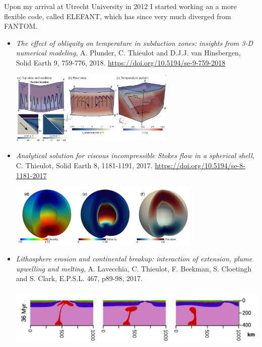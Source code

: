 Upon my arrival at Utrecht University in 2012 I started working an a more flexible code, called ELEFANT, which has since very much 
diverged from FANTOM.

\begin{itemize}
\item {\it The effect of obliquity on temperature in subduction zones: insights from 3-D numerical modeling}, 
A. Plunder, C. Thieulot and D.J.J. van Hinsbergen, Solid Earth 9, 759-776, 2018. \url{https://doi.org/10.5194/se-9-759-2018}

\begin{center}
\includegraphics[height=3.5cm]{images/mycodes/pltv18_img}
\end{center}


\item {\it Analytical solution for viscous incompressible Stokes flow in a spherical shell}, 
C. Thieulot, Solid Earth 8, 1181-1191, 2017. \url{https://doi.org/10.5194/se-8-1181-2017}

\begin{center}
\includegraphics[height=3cm]{images/mycodes/thie17}
\end{center}



\item  {\it Lithosphere erosion and continental breakup: interaction of extension, plume upwelling and melting}, 
A. Lavecchia, C. Thieulot, F. Beekman, S. Cloetingh and S. Clark, E.P.S.L. 467, p89-98, 2017.

\begin{center}
\includegraphics[height=3cm]{images/mycodes/latv17_img}
\end{center}



\end{itemize}

